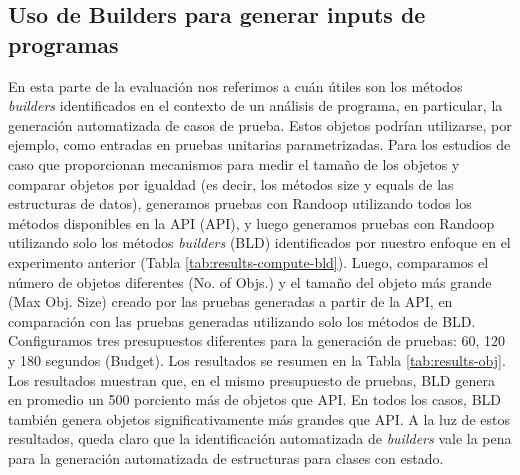 





% 
\subsection{Uso de Builders para generar inputs de programas}
En esta parte de la evaluación nos referimos a cuán útiles son los métodos \emph{builders} identificados en el contexto de un análisis de programa, en particular, la generación automatizada de casos de prueba. Estos objetos podrían utilizarse, por ejemplo, como entradas en pruebas unitarias parametrizadas. Para los estudios de caso que proporcionan mecanismos para medir el tamaño de los objetos y comparar objetos por igualdad (es decir, los métodos size y equals de las estructuras de datos), generamos pruebas con Randoop utilizando todos los métodos disponibles en la API (API), y luego generamos pruebas con Randoop utilizando solo los métodos \emph{builders} (BLD) identificados por nuestro enfoque en el experimento anterior (Tabla \ref{tab:results-compute-bld}). Luego, comparamos el número de objetos diferentes (No. of Objs.) y el tamaño del objeto más grande (Max Obj. Size) creado por las pruebas generadas a partir de la API, en comparación con las pruebas generadas utilizando solo los métodos de BLD. Configuramos tres presupuestos diferentes para la generación de pruebas: 60, 120 y 180 segundos (Budget). Los resultados se resumen en la Tabla \ref{tab:results-obj}. Los resultados muestran que, en el mismo presupuesto de pruebas, BLD genera en promedio un 500 porciento más de objetos que API. En todos los casos, BLD también genera objetos significativamente más grandes que API. A la luz de estos resultados, queda claro que la identificación automatizada de \emph{builders} vale la pena para la generación automatizada de estructuras para clases con estado.



